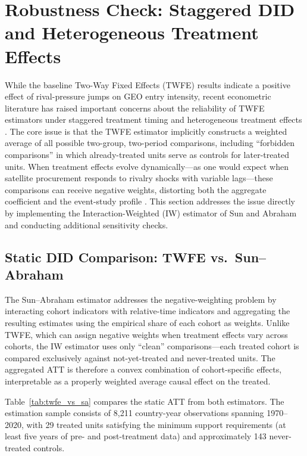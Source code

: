 \documentclass[11pt]{article}
\begin{document}
\section{Robustness Check: Staggered DID and Heterogeneous Treatment Effects}
\label{sec:robustness}

While the baseline Two-Way Fixed Effects (TWFE) results indicate a positive effect of rival-pressure jumps on GEO entry intensity, recent econometric literature has raised important concerns about the reliability of TWFE estimators under staggered treatment timing and heterogeneous treatment effects \citep{roth2023}. The core issue is that the TWFE estimator implicitly constructs a weighted average of all possible two-group, two-period comparisons, including ``forbidden comparisons'' in which already-treated units serve as controls for later-treated units. When treatment effects evolve dynamically---as one would expect when satellite procurement responds to rivalry shocks with variable lags---these comparisons can receive negative weights, distorting both the aggregate coefficient and the event-study profile \citep{goodmanbacon2021, dechaisemartin2020}. This section addresses the issue directly by implementing the Interaction-Weighted (IW) estimator of Sun and Abraham \cite{sunab2021} and conducting additional sensitivity checks.


\subsection{Static DID Comparison: TWFE vs.\ Sun--Abraham}

The Sun--Abraham estimator addresses the negative-weighting problem by interacting cohort indicators with relative-time indicators and aggregating the resulting estimates using the empirical share of each cohort as weights. Unlike TWFE, which can assign negative weights when treatment effects vary across cohorts, the IW estimator uses only ``clean'' comparisons---each treated cohort is compared exclusively against not-yet-treated and never-treated units. The aggregated ATT is therefore a convex combination of cohort-specific effects, interpretable as a properly weighted average causal effect on the treated.

Table~\ref{tab:twfe_vs_sa} compares the static ATT from both estimators. The estimation sample consists of 8,211 country-year observations spanning 1970--2020, with 29 treated units satisfying the minimum support requirements (at least five years of pre- and post-treatment data) and approximately 143 never-treated controls.
\end{document}

